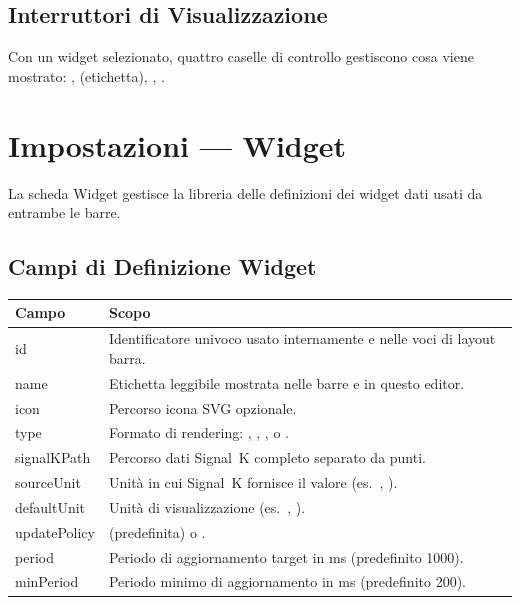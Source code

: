 \section{Interruttori di Visualizzazione}

Con un widget selezionato, quattro caselle di controllo gestiscono cosa viene mostrato:
,  (etichetta), , .

\chapter{Impostazioni --- Widget}
\label{ch:impostazioni-widget}

La scheda Widget gestisce la libreria delle definizioni dei widget dati usati da entrambe le barre.

\section{Campi di Definizione Widget}

\begin{longtable}{L{3.0cm}L{10.7cm}}
\toprule
{}
\color{white}\sffamily\bfseries Campo &
\color{white}\sffamily\bfseries Scopo \\
\midrule
id              & Identificatore univoco usato internamente e nelle voci di layout barra. \\
name            & Etichetta leggibile mostrata nelle barre e in questo editor. \\
icon            & Percorso icona SVG opzionale. \\
type            & Formato di rendering: , , ,
                   o . \\
signalKPath     & Percorso dati Signal~K completo separato da punti. \\
sourceUnit      & Unità in cui Signal~K fornisce il valore (es.\ , ). \\
defaultUnit     & Unità di visualizzazione (es.\ , ). \\
updatePolicy    &  (predefinita) o . \\
period          & Periodo di aggiornamento target in ms (predefinito 1000). \\
minPeriod       & Periodo minimo di aggiornamento in ms (predefinito 200). \\
\bottomrule
\end{longtable}

